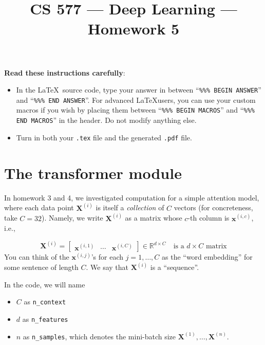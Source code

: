 \documentclass{article}
\title{CS 577 --- Deep Learning --- Homework 5}
\author{}
\date{}
\newcommand{\bfx}{\mathbf{x}}
\newcommand{\bfX}{\mathbf{X}}
\begin{document}
\maketitle
\textbf{Read these instructions carefully}:
\begin{itemize}
  \item
In the \LaTeX~source code, type your answer in between
``\verb|%%% BEGIN ANSWER|'' and
``\verb|%%% END ANSWER|''.
        For advanced \LaTeX users,
        you can use your custom macros if you wish
        by placing them
        between
``\verb|%%% BEGIN MACROS|'' and
``\verb|%%% END MACROS|'' in the header.
        Do not modify anything else.




  \item Turn in both your \verb|.tex| file and the generated \verb|.pdf| file.
\end{itemize}



\section{The transformer module}

In homework 3 and 4, we investigated computation for a simple attention model,
where each data  point
\(\bfX^{(i)}\)
is itself a \emph{collection} of \(C\) vectors (for concreteness, take \(C = 32\)).
Namely, we write
\(\bfX^{(i)}\) as a matrix whose \(c\)-th column is \(\bfx^{(i,c)}\), i.e.,

\[
\bfX^{(i)}
=
\begin{bmatrix}
\bfx^{(i,1)} & \cdots & \bfx^{(i,C)}
\end{bmatrix} \in \mathbb{R}^{d \times C} \quad \text{is a } d \times C \text{ matrix}
\]
You can think of the \(\bfx^{(i,j)}\)'s for each \(j = 1,\dots, C\) as the ``word embedding'' for some sentence of length \(C\).
We say that \(\bfX^{(i)}\) is a ``sequence''.

\vspace{1em}

In the code, we will name

\begin{itemize}
  \item

\(C\) as \texttt{n\_context}

  \item
\(d\) as \texttt{n\_features}

  \item
\(n\) as \texttt{n\_samples}, which denotes the mini-batch size \(\bfX^{(1)},\dots, \bfX^{(n)}\).

        
\end{itemize}
\end{document}
